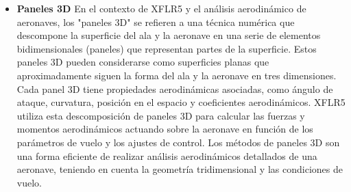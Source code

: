 \begin{itemize}
Aunque XFLR5 no simula explícitamente vórtices anulares, puede ayudarte a comprender los patrones de flujo y las condiciones que podrían llevar a su formación. Este conocimiento puede orientarte en el diseño de alas y aeronaves para minimizar el impacto de la turbulencia de estela.
\item  \textbf{Paneles 3D} En el contexto de XFLR5 y el análisis aerodinámico de aeronaves, los "paneles 3D" se refieren a una técnica numérica que descompone la superficie del ala y la aeronave en una serie de elementos bidimensionales (paneles) que representan partes de la superficie. 
Estos paneles 3D pueden considerarse como superficies planas que aproximadamente siguen la forma del ala y la aeronave en tres dimensiones.
Cada panel 3D tiene propiedades aerodinámicas asociadas, como ángulo de ataque, curvatura, posición en el espacio y coeficientes aerodinámicos.
XFLR5 utiliza esta descomposición de paneles 3D para calcular las fuerzas y momentos aerodinámicos actuando sobre la aeronave en función de los parámetros de vuelo y los ajustes de control. Los métodos de paneles 3D son una forma eficiente de realizar análisis aerodinámicos detallados de una aeronave, teniendo en cuenta la geometría tridimensional y las condiciones de vuelo.
\end{itemize}

